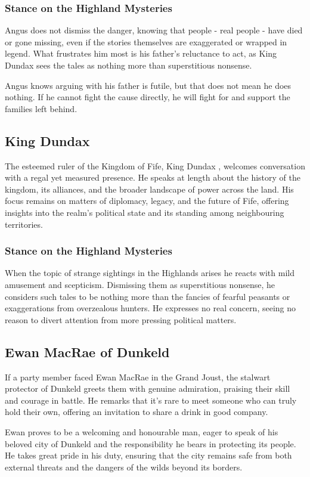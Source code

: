 \subsubsection*{Stance on the Highland Mysteries}
{\entryfont Angus does not dismiss the danger, knowing that people - real people - have died or gone missing, even if the stories themselves are exaggerated or wrapped in legend. What frustrates him most is his father's reluctance to act, as King Dundax  sees the tales as nothing more than superstitious nonsense.

Angus knows arguing with his father is futile, but that does not mean he does nothing. If he cannot fight the cause directly, he will fight for and support the families left behind.}
\subsection*{King Dundax }
{\entryfont The esteemed ruler of the Kingdom of Fife, King Dundax , welcomes conversation with a regal yet measured presence. He speaks at length about the history of the kingdom, its alliances, and the broader landscape of power across the land. His focus remains on matters of diplomacy, legacy, and the future of Fife, offering insights into the realm's political state and its standing among neighbouring territories.}
\subsubsection*{Stance on the Highland Mysteries}
{\entryfont When the topic of strange sightings in the Highlands arises he reacts with mild amusement and scepticism. Dismissing them as superstitious nonsense, he considers such tales to be nothing more than the fancies of fearful peasants or exaggerations from overzealous hunters. He expresses no real concern, seeing no reason to divert attention from more pressing political matters.}
\subsection*{Ewan MacRae of Dunkeld}
{\entryfont If a party member faced Ewan MacRae in the Grand Joust, the stalwart protector of Dunkeld greets them with genuine admiration, praising their skill and courage in battle. He remarks that it's rare to meet someone who can truly hold their own, offering an invitation to share a drink in good company.

Ewan proves to be a welcoming and honourable man, eager to speak of his beloved city of Dunkeld and the responsibility he bears in protecting its people. He takes great pride in his duty, ensuring that the city remains safe from both external threats and the dangers of the wilds beyond its borders.}
